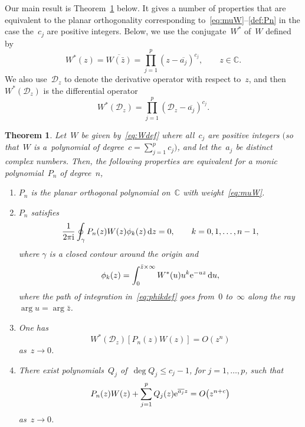 \documentclass[10pt,a4paper]{article}
\numberwithin{equation}{section}
\newtheorem{Theorem}{Theorem}[section]
\newcommand*{\Cset}{\mathbb{C}} %
\begin{document}
 Our main result is Theorem~\ref{thm:theo1} below. It gives a number of properties that are equivalent to the planar orthogonality corresponding to~\eqref{eq:muW}--\eqref{def:Pn} in the case the~$c_j$ are positive integers. Below, we use the conjugate~$W^*$ of~$W$ defined by
 \begin{equation}
 \label{eq:Wconj}
 W^*(z) = \overline{W(\bar{z})} = \prod_{j=1}^p (z-\overline{a_j})^{c_j}, \qquad z \in \Cset.
 \end{equation}
 We also use~$\mathscr{D}_z$ to denote the derivative operator with respect to~$z$, and then~$W^*(\mathscr{D}_z)$ is the differential operator
 \begin{equation}
 \label{eq:Woperator}
 W^*(\mathscr{D}_z) = \prod_{j=1}^p (\mathscr{D}_z - \overline{a_j})^{c_j}.
 \end{equation}

 \begin{Theorem}
 \label{thm:theo1}
 Let~$W$ be given by~\eqref{eq:Wdef} where all~$c_j$ are positive integers $\big($so that~$W$ is a~polynomial of degree~$c = \sum_{j=1}^p c_j\big)$, and let the~$a_j$ be distinct complex numbers. Then, the following properties are equivalent for a monic polynomial~$P_n$ of degree~$n$,
 \begin{enumerate}
 \item[$(a)$] $P_n$ is the planar orthogonal polynomial on~$\Cset$ with weight~\eqref{eq:muW}.
 \item[$(b)$] $P_n$ satisfies
 \begin{equation}
 \label{eq:Pnequiv2}
 \frac{1}{2\pi {\rm i}} \oint_{\gamma} P_n(z) W(z) \phi_k(z)\, {\rm d}z = 0, \qquad k=0,1, \dots, n-1,
 \end{equation}
 where $\gamma$ is a closed contour around the origin and
 \begin{equation}
 \label{eq:phikdef}
 \phi_k(z) = \int_0^{\bar{z} \times \infty} W^*(u) u^k {\rm e}^{-uz}\, {\rm d}u,
 \end{equation}
 where the path of integration in~\eqref{eq:phikdef} goes from~$0$ to~$\infty$ along the ray $\arg u = \arg \bar{z}$.
 \item[$(c)$] One has
 \begin{equation}
 \label{eq:Pnequiv3}
 W^*(\mathscr{D}_z) \left[ P_n(z) W(z) \right] = O(z^n)
 \end{equation}
 as~$z \to 0$.
 \item[$(d)$] There exist polynomials~$Q_j$ of~$\deg Q_j \leq c_j-1$, for $j=1, \dots, p$, such that
 \begin{equation}
 \label{eq:Pnequiv4}
 P_n(z) W(z) + \sum_{j=1}^p Q_j(z) {\rm e}^{\overline{a_j} z} = O\big(z^{n + c}\big)
 \end{equation}
 as~$z \to 0$.
 \end{enumerate}
 \end{Theorem}
\end{document}
